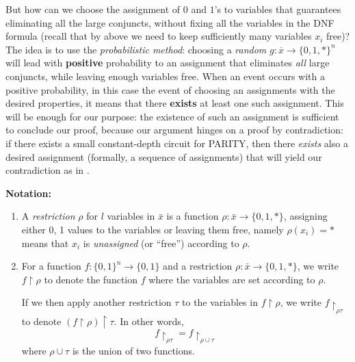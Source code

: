 But how can we choose the assignment of $0$ and $1$'s to variables that guarantees eliminating all the large conjuncts, without fixing all the variables in the DNF formula (recall that by  above we need to keep sufficiently many variables $x_i$ free)?
The idea is to use the \emph{probabilistic method}: choosing a \emph{random} $g: \overline x \to \{0,1, *\}^n$ will lead with \textbf{positive} probability to an assignment that eliminates \emph{all} large conjuncts, while leaving enough variables free. When an event occurs with a positive probability, in this case the event of choosing an assignments with the desired properties, it means that there \textbf{exists} at least one such assignment. This will be enough for our purpose: the existence of such an assignment is sufficient to conclude our proof, because our argument hinges on a proof by contradiction: if there exists a small constant-depth circuit for PARITY, then there \emph{exists} also a desired assignment (formally, a sequence of assignments) that will yield our contradiction as in .


\textbf{Notation:} 
\begin{enumerate}
\item 
 A \textit{restriction} $\rho$ for $l$ variables in $\bar{x}$ is a function $\rho: \bar{x} \to \{0,1, *\}$, assigning either 0, 1 values to the variables or leaving them free, namely $\rho(x_i) = *$ means that $x_i$ is \textit{unassigned} (or ``free'') according to $\rho$.

 
\item For a function $f: \{0,1\}^n \to \{0,1\}$ and a   restriction $\rho: \bar{x} \to \{0,1, *\}$, we write $f\upharpoonright \rho$ to denote the function $f$ where the variables are set according to $\rho$.

If we then apply another restriction $\tau$ to the variables in $f\upharpoonright \rho$, we 
write $f\upharpoonright_{\rho\tau}$ to denote $(f\upharpoonright \rho)\upharpoonright \tau$. In other words,
\[
f\upharpoonright_{\rho\tau} = f\upharpoonright_{\rho \cup \tau}
\]
where $\rho \cup \tau$ is the union of two functions.
\end{enumerate}



